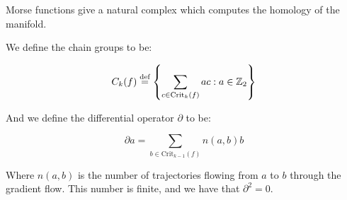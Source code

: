 Morse functions give a natural complex which computes the homology
of the manifold.

We define the chain groups 
to be:

$$
C_k(f)
\stackrel{\text{def}}{=}
\left\{
\sum
_
{c\in \text{Crit}_{k}(f)}
a c
:
a\in \mathbb{Z}_2
\right\}
$$

And we define the differential operator $\partial$ to be:

$$
\partial a
=
\sum
_{b\in \text{Crit}_{k-1}(f)}
n(a,b)b
$$

Where $n(a,b)$ is the number of trajectories flowing from $a$
to $b$ through the gradient flow. This number is finite, and
we have that $\partial^2=0$.

